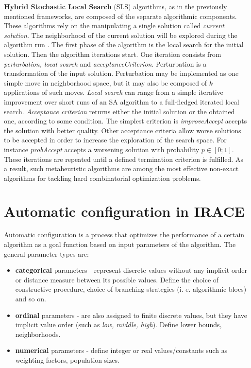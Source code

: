 \documentclass[12pt]{article}
\begin{document}
\textbf{Hybrid Stochastic Local Search} (SLS) algorithms, as in the previously mentioned frameworks, are composed of the separate algorithmic components. These algorithms rely on the manipulating a single solution called \emph{current solution}. The neighborhood of the current solution will be explored during the algorithm run \cite{hsls}. The first phase of the algorithm is the local search for the initial solution. Then the algorithm iterations start. One iteration consists from \emph{perturbation, local search} and \emph{acceptanceCriterion}. Perturbation is a transformation of the input solution. Perturbation may be implemented as one simple move in neighborhood space, but it may also be composed of $k$ applications of such moves. \emph{Local search} can range from a simple iterative improvement over short runs of an SA algorithm to a full-fledged iterated local search. \emph{Acceptance criterion} returns either the initial solution or the obtained one, according to some condition. The simplest criterion is \emph{improveAccept} accepts the solution with better quality. Other acceptance criteria allow worse solutions to be accepted in order to increase the exploration of the search space. For instance \emph{probAccept} accepts a worsening solution with probability $p \in [0;1]$. These iterations are repeated until a defined termination criterion is fulfilled. As a result, such metaheuristic algorithms are among the most effective non-exact algorithms for tackling hard combinatorial optimization problems.


\section{Automatic configuration in IRACE}

Automatic configuration is a process that optimizes the performance of a certain algorithm as a goal function based on input parameters of the algorithm. The general parameter types are:
 
\begin{itemize}
\item \textbf{categorical} parameters - represent discrete values without any implicit order or distance measure between its possible values. Define the choice of constructive procedure, choice of branching strategies (i. e. algorithmic blocs) and so on.
\item \textbf{ordinal} parameters - are also assigned to finite discrete values, but they have implicit value order (such as \emph{low, middle, high}). Define lower bounds, neighborhoods.
\item \textbf{numerical} parameters - define integer or real values/constants such as weighting factors, population sizes.
\end{itemize}
\end{document}
